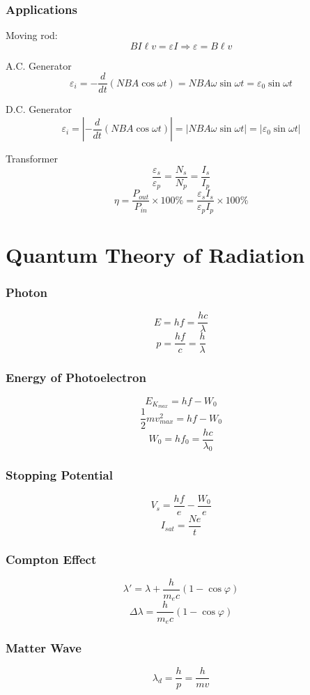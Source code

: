 \documentclass{article}
\begin{document}
\subsubsection*{Applications}

\noindent Moving rod:
\[BI\ell v=\varepsilon I \Rightarrow \varepsilon=B\ell v\]

A.C. Generator
\[\varepsilon_i=-\frac{d}{dt}(NBA\cos\omega t)=NBA\omega\sin\omega t=\varepsilon_0\sin\omega t\]

D.C. Generator
\[\varepsilon_i=|-\frac{d}{dt}(NBA\cos\omega t)|=|NBA\omega\sin\omega t|=|\varepsilon_0\sin\omega t|\]

Transformer
\[\frac{\varepsilon_s}{\varepsilon_p}=\frac{N_s}{N_p}=\frac{I_s}{I_p}\]
\[\eta=\frac{P_{out}}{P_{in}}\times 100\%=\frac{\varepsilon_s I_s}{\varepsilon_p I_p}\times 100\%\]


\section{Quantum Theory of Radiation}
\subsubsection*{Photon}
\[E=hf=\frac{hc}{\lambda}\]
\[p=\frac{hf}{c}=\frac{h}{\lambda}\]

\subsubsection*{Energy of Photoelectron}
\[E_{K_{max}}=hf-W_0\]
\[\frac{1}{2}mv_{max}^2=hf-W_0\]
\[W_0=hf_0=\frac{hc}{\lambda_0}\]

\subsubsection*{Stopping Potential}
\[V_s=\frac{hf}{e}-\frac{W_0}{e}\]
\[I_{sat}=\frac{Ne}{t}\]

\subsubsection*{Compton Effect}
\[\lambda'=\lambda+\frac{h}{m_ec}(1-\cos\varphi)\]
\[\Delta\lambda=\frac{h}{m_ec}(1-\cos\varphi)\]

\subsubsection*{Matter Wave}
\[\lambda_d=\frac{h}{p}=\frac{h}{mv}\]
\end{document}
